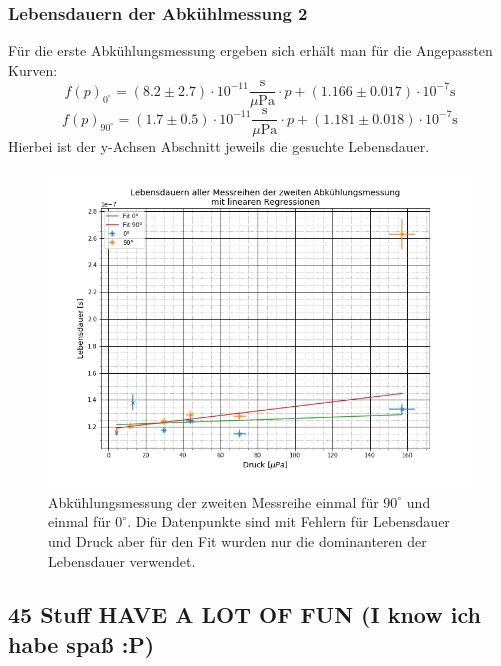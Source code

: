 \subsubsection{Lebensdauern der Abkühlmessung 2}
Für die erste Abkühlungsmessung ergeben sich erhält man für die Angepassten Kurven:
\begin{equation*}
f(p)_{0^\circ}=(8.2\pm 2.7)\cdot 10^{-11} \frac{\text{s}}{\text{$\mu$Pa}}\cdot p + (1.166\pm 0.017)\cdot 10^{-7} \text{s}
\end{equation*}
\begin{equation*}
f(p)_{90^\circ}=(1.7\pm 0.5)\cdot 10^{-11} \frac{\text{s}}{\text{$\mu$Pa}}\cdot p + (1.181\pm 0.018)\cdot 10^{-7} \text{s}
\end{equation*}
Hierbei ist der y-Achsen Abschnitt jeweils die gesuchte Lebensdauer.
\begin{figure}[ht]
	\includegraphics[scale=0.5]{Bild/Abk2}
	\centering
	\caption[Druck zu Lebensdauer Fit für Abkühlung 2]{Abkühlungsmessung der zweiten Messreihe einmal für $90^\circ$ und einmal für $0^\circ$. Die Datenpunkte sind mit Fehlern für Lebensdauer und Druck aber für den Fit wurden nur die dominanteren der Lebensdauer verwendet.}
	\label{Abk2}
\end{figure}
\subsection{45 Stuff HAVE A LOT OF FUN (I know ich habe spaß :P)}